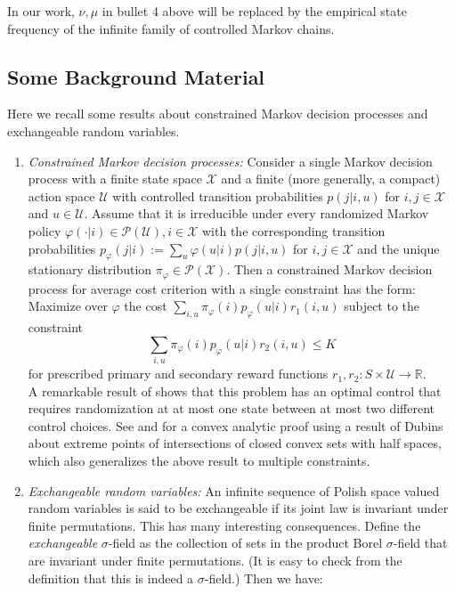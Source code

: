 \documentclass[12pt]{article}
\numberwithin{equation}{section}
\newcommand{\PA}{\mathcal{P}}
\newcommand{\1}{\textbf{1}}
\newcommand{\U}{\mathcal{U}}
\newcommand{\X}{\mathcal{X}}
\begin{document}
In our work, $\nu, \mu$ in bullet 4 above will be replaced by the empirical state frequency of the infinite family of controlled Markov chains. 

\subsection{Some Background Material}

Here we recall some results about constrained Markov decision processes and exchangeable random variables.

\begin{enumerate}

\item \textit{Constrained Markov decision processes:} Consider a single Markov decision process with a finite state space $\X$ and a finite (more generally, a compact) action space $\U$ with controlled transition probabilities $p(j|i,u)$ for $i,j \in \X$ and $u \in \U$. Assume that it is irreducible under every randomized Markov policy $\varphi(\cdot|i) \in \PA(\U), i \in \X$ with the corresponding transition probabilities $p_\varphi(j|i) := \sum_u\varphi(u|i)p(j|i,u)$ for $i,j \in \X$ and the unique stationary distribution $\pi_\varphi \in \PA(\X)$. Then a constrained Markov decision process for average cost criterion with a single constraint has the form:\\

\noindent Maximize over $\varphi$ the cost $\sum_{i,u}\pi_\varphi(i)p_\varphi(u|i)r_1(i,u)$ subject to the constraint 
$$\sum_{i,u}\pi_\varphi(i)p_\varphi(u|i)r_2(i,u) \leq K$$ 
for prescribed primary and secondary reward functions $r_1, r_2 : S\times\U \to \mathbb{R}$.\\

A remarkable result of \cite{Ross} shows that this problem has an optimal control that requires randomization at at most one state between at most two different control choices. See \cite{BorkarConstrained} and \cite{BorkarConstraint} for a convex analytic proof using a result of Dubins \cite{Dubins} about extreme points of intersections of closed convex sets with half spaces, which also generalizes the above result to multiple constraints.

\item \textit{Exchangeable random variables:} An infinite sequence of Polish space valued random variables is said to be exchangeable if its joint law is invariant under finite permutations. This has many interesting consequences. Define the \textit{exchangeable} $\sigma$-field as the collection of sets in the product Borel $\sigma$-field that are invariant under finite permutations. (It is easy to check from the definition that this is indeed a $\sigma$-field.) Then we have:\\


\end{enumerate}
\end{document}
